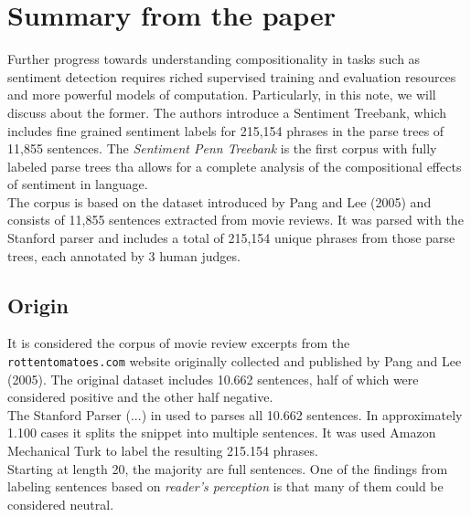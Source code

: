 \section{Summary from the paper}

Further progress towards understanding compositionality in tasks such as
sentiment detection requires riched supervised training and evaluation resources
and more powerful models of computation. Particularly, in this note, we will
discuss about the former. The authors introduce a Sentiment Treebank, which
includes fine grained sentiment labels for 215,154 phrases in the parse trees of
11,855 sentences. The \textit{Sentiment Penn Treebank} is the first corpus with
fully labeled parse trees tha allows for a complete analysis of the
compositional effects of sentiment in language.\\ 
The corpus is based on the dataset introduced by Pang and Lee (2005) and
consists of 11,855 sentences extracted from movie reviews. It was parsed with
the Stanford parser and includes a total of 215,154 unique phrases from those
parse trees, each annotated by 3 human judges.

\subsection{Origin}

It is considered the corpus of movie review excerpts from the
\texttt{rottentomatoes.com} website originally collected and published by Pang
and Lee (2005).
The original dataset includes 10.662 sentences, half of which were considered
positive and the other half negative.\\
The Stanford Parser (...) in used to parses all 10.662 sentences. In
approximately 1.100 cases it splits the snippet into multiple sentences. It was
used Amazon Mechanical Turk to label the resulting 215.154 phrases.\\
Starting at length 20, the majority are full sentences. One of the findings from
labeling sentences based on \textit{reader's perception} is that many of them
could be considered neutral.
